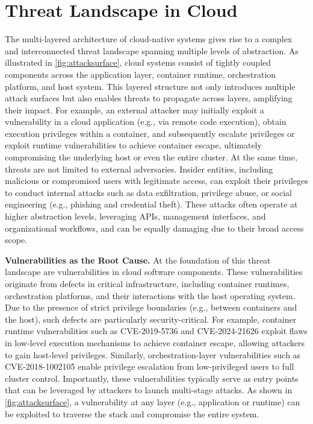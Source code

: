 \section{Threat Landscape in Cloud}

The multi-layered architecture of cloud-native systems gives rise to a complex and interconnected threat landscape spanning multiple levels of abstraction. As illustrated in \autoref{fig:attacksurface}, cloud systems consist of tightly coupled components across the application layer, container runtime, orchestration platform, and host system. This layered structure not only introduces multiple attack surfaces but also enables threats to propagate across layers, amplifying their impact. For example, an external attacker may initially exploit a vulnerability in a cloud application (e.g., via remote code execution), obtain execution privileges within a container, and subsequently escalate privileges or exploit runtime vulnerabilities to achieve container escape, ultimately compromising the underlying host or even the entire cluster. At the same time, threats are not limited to external adversaries. Insider entities, including malicious or compromised users with legitimate access, can exploit their privileges to conduct internal attacks such as data exfiltration, privilege abuse, or social engineering (e.g., phishing and credential theft). These attacks often operate at higher abstraction levels, leveraging APIs, management interfaces, and organizational workflows, and can be equally damaging due to their broad access scope.

\textbf{Vulnerabilities as the Root Cause.} At the foundation of this threat landscape are vulnerabilities in cloud software components. These vulnerabilities originate from defects in critical infrastructure, including container runtimes, orchestration platforms, and their interactions with the host operating system. Due to the presence of strict privilege boundaries (e.g., between containers and the host), such defects are particularly security-critical. For example, container runtime vulnerabilities such as CVE-2019-5736 and CVE-2024-21626 exploit flaws in low-level execution mechanisms to achieve container escape, allowing attackers to gain host-level privileges. Similarly, orchestration-layer vulnerabilities such as CVE-2018-1002105 enable privilege escalation from low-privileged users to full cluster control. Importantly, these vulnerabilities typically serve as entry points that can be leveraged by attackers to launch multi-stage attacks. As shown in \autoref{fig:attacksurface}, a vulnerability at any layer (e.g., application or runtime) can be exploited to traverse the stack and compromise the entire system.


